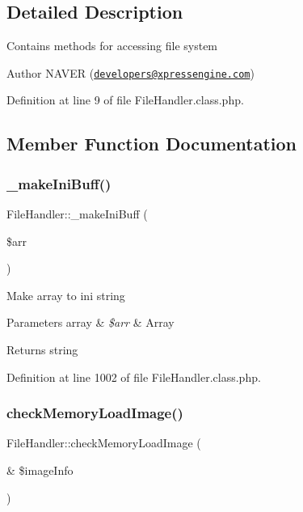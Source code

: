 \subsection{Detailed Description}
Contains methods for accessing file system

\begin{DoxyAuthor}{Author}
N\+A\+V\+ER (\href{mailto:developers@xpressengine.com}{\tt developers@xpressengine.\+com}) 
\end{DoxyAuthor}


Definition at line 9 of file File\+Handler.\+class.\+php.



\subsection{Member Function Documentation}
\mbox{\label{classFileHandler_a8975f9247987757497e0288f3ee09173}} 
\subsubsection{\texorpdfstring{\+\_\+make\+Ini\+Buff()}{\_makeIniBuff()}}
{\footnotesize\ttfamily File\+Handler\+::\+\_\+make\+Ini\+Buff (\begin{DoxyParamCaption}\item[{}]{\$arr }\end{DoxyParamCaption})}

Make array to ini string


\begin{DoxyParams}[1]{Parameters}
array & {\em \$arr} & Array \\
\hline
\end{DoxyParams}
\begin{DoxyReturn}{Returns}
string 
\end{DoxyReturn}


Definition at line 1002 of file File\+Handler.\+class.\+php.

\mbox{\label{classFileHandler_a0b240e89b6ce57cb94e855fc25e5e9f3}} 
\subsubsection{\texorpdfstring{check\+Memory\+Load\+Image()}{checkMemoryLoadImage()}}
{\footnotesize\ttfamily File\+Handler\+::check\+Memory\+Load\+Image (\begin{DoxyParamCaption}\item[{\&}]{\$image\+Info }\end{DoxyParamCaption})}

